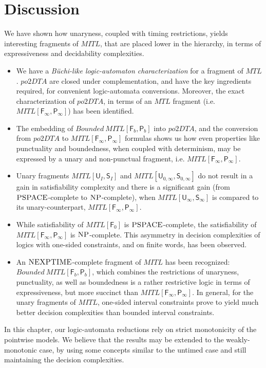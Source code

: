 \documentclass{llncs}
\newcommand{\class}{\textsc}
\newcommand{\until}{\textsf{U}}
\newcommand{\since}{\textsf{S}}
\newcommand{\fut}{\textsf{F}}
\newcommand{\past}{\textsf{P}}
\newcommand{\mitlus}{\mbox{$\mathit{MITL[\until_I,\since_I]}$}}
\newcommand{\bmitlfp}{\mbox{$\mathit{Bounded ~MITL[\fut_b,\past_b]}$}}
\newcommand{\potdta}{\mbox{$\mathit{po2DTA}$}}
\newcommand{\mitlfpinf}{\mbox{$\mathit{MITL[\fut_\infty,\past_\infty]}$}}
\newcommand{\mitlusinf}{\mbox{$\mathit{MITL[\until_\infty,\since_\infty]}$}}
\newcommand{\mitlfpb}{\bmitlfp}
\newcommand{\mitl}{\mbox{$\mathit{MITL}$}}
\newcommand{\mtl}{\mbox{$\mathit{MTL}$}}
\newcommand{\mitluszinf}{\mbox{$\mathit{MITL[\until_{0,\infty},\since_{0,\infty}]}$}}
\newcommand{\mitlfz}{\mbox{$\mathit{MITL[\fut_{0}]}$}}
\newcommand{\pspace}{\mbox{$\class{PSPACE}$}}
\newcommand{\nexptime}{\mbox{$\class{NEXPTIME}$}}
\newcommand{\np}{\mbox{$\class{NP}$}}
\begin{document}
\section{Discussion}
We have shown how unaryness, coupled with timing restrictions, yields interesting fragments of \mitl, that are placed lower in the hierarchy, in terms of expressiveness and decidability complexities.
\begin{itemize}
\item We have a \emph{B\"uchi-like logic-automaton characterization} for a fragment of \mtl. \potdta\/ are closed under complementation, and have the key ingredients required, for convenient logic-automata conversions. Moreover, the exact characterization of \potdta, in terms of an \mtl\/ fragment (i.e. \mitlfpinf) has been identified.
\item The embedding of \mitlfpb\/ into \potdta, and the conversion from \potdta\/ to \mitlfpinf\/ formulas shows us how even properties like punctuality and boundedness, when coupled with determinism, may be expressed by a unary and non-punctual fragment, i.e. \mitlfpinf.
\item Unary fragments \mitlus\/ and \mitluszinf\/ do not result in a gain in satisfiability complexity and there is a significant gain (from \pspace-complete to \np-complete), when \mitlusinf\/ is compared to its unary-counterpart, \mitlfpinf.
\item While satisfiability of \mitlfz\/ is \pspace-complete, the satisfiability of \mitlfpinf\/ is \np-complete. This asymmetry in decision complexities of logics with one-sided constraints, and on finite words, has been observed.
\item An \nexptime-complete fragment of \mitl\/ has been recognized: \mitlfpb, which combines the restrictions of unaryness, punctuality, as well as boundedness is a rather restrictive logic in terms of expressiveness, but more succinct than \mitlfpinf.  In general, for the unary fragments of \mitl, one-sided interval constraints prove to yield much better decision complexities than bounded interval constraints.
\end{itemize}

In this chapter, our logic-automata reductions rely on strict monotonicity of the pointwise models. We believe that the results may be extended to the weakly-monotonic case, by using some concepts similar to the untimed case and still maintaining the decision complexities. 



\end{document}
